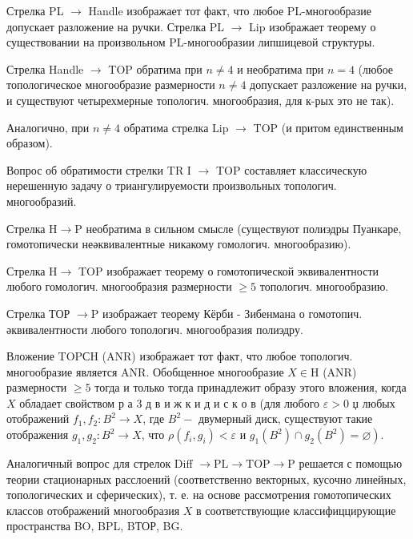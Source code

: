 \documentclass[10pt]{article}
\begin{document}
Стрелка PL $\rightarrow$ Handle изображает тот факт, что любое PL-многообразие допускает разложение на ручки. Стрелка PL $\rightarrow$ Lip изображает теорему о существовании на произвольном PL-многообразии липшицевой структуры.



Стрелка Handle $\rightarrow$ TOP обратима при $n \neq 4$ и необратима при $n=4$ (любое топологическое многообразие размерности $n \neq 4$ допускает разложение на ручки, и существуют четырехмерные топологич. многообразия, для к-рых это не так).



Аналогично, при $n \neq 4$ обратима стрелка Lip $\rightarrow$ TOP (и притом единственным образом).



Вопрос об обратимости стрелки TR I $\rightarrow$ TOP составляет классическую нерешенную задачу о триангулируемости произвольных топологич. многообразий.



Стрелка $\mathrm{H} \rightarrow \mathrm{P}$ необратима в сильном смысле (существуют полиэдры Пуанкаре, гомотопически неәквивалентные никакому гомологич. многообразию).



Стрелка $\mathrm{H} \rightarrow$ TOP изображает теорему о гомотопической эквивалентности любого гомологич. многообразия размерности $\geqslant 5$ топологич. многообразию.



Стрелка ТОР $\rightarrow \mathrm{P}$ изображает теорему Кёрби - Зибенмана о гомотопич. әквивалентности любого топологич. многообразия полиэдру.



Вложение TOPСH (ANR) изображает тот факт, что любое топологич. многообразие является ANR. Обобщенное многообразие $X \in \mathrm{H}$ (ANR) размерности $\geqslant 5$ тогда и только тогда принадлежит образу этого вложения, когда $X$ обладает свойством р а 3 д в и ж к и д и с к о в (для любого $\varepsilon>0$ џ любых отображений $f_{1}, f_{2}: B^{2} \rightarrow X$, где $B^{2}-$ двумерный диск, существуют такие отображения $g_{1}, g_{2}: B^{2} \rightarrow X$, что $\rho\left(f_{i}, g_{i}\right)<\varepsilon$ и $\left.g_{1}\left(B^{2}\right) \cap g_{2}\left(B^{2}\right)=\varnothing\right)$.



Аналогичный вопрос для стрелок Diff $\rightarrow \mathrm{PL} \rightarrow \mathrm{TOP} \rightarrow \mathrm{P}$ решается с помощью теории стационарных расслоений (соответственно векторных, кусочно линейных, топологических и сферических), т. е. на основе рассмотрения гомотопических классов отображений многообразия $X$ в соответствующие классифиццирующие пространства BO, BPL, BТОР, BG.
\end{document}

